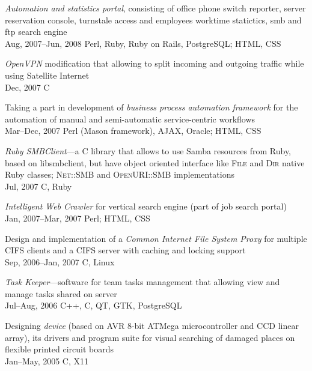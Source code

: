 \documentclass[12pt, a4paper]{article}
\newcommand{\years}[2]{\marginpar{\scriptsize #1 #2}}
\begin{document}
\begin{list}{}{\leftmargin=0pt}
    \item \textit {Automation and statistics portal}, consisting of office phone switch
    reporter, server reservation console, turnstale access and employees
    worktime statictics, smb and ftp search engine\\
    Aug, 2007--Jun, 2008 \hfill Perl, Ruby, Ruby on Rails, PostgreSQL; HTML, CSS

    \item \textit{OpenVPN} modification that allowing to split incoming and outgoing traffic while using Satellite
    Internet\\
    Dec, 2007 \hfill C

    \item Taking a part in development of \textit{business process automation framework}
    for the automation of manual and semi-automatic service-centric
    workflows\\
    Mar--Dec, 2007 \hfill Perl (Mason framework), AJAX, Oracle; HTML, CSS

    \item \textit{Ruby SMBClient}---a C library that allows to use Samba resources from Ruby, based on
    libsmbclient, but have object oriented interface like \textsc{File} and \textsc{Dir} native Ruby classes;
    \textsc{Net::SMB} and \textsc{OpenURI::SMB} implementations\\
    Jul, 2007 \hfill C, Ruby

    \item \textit{Intelligent Web Crawler} for vertical search engine (part of job search
    portal)\\
    Jan, 2007--Mar, 2007 \hfill Perl; HTML, CSS

    \item Design and implementation of a \textit{Common Internet File System Proxy}
    for multiple CIFS clients and a CIFS server with caching and locking
    support\\
    Sep, 2006--Jan, 2007 \hfill C, Linux

    \item \textit{Task Keeper}---software for team tasks management that allowing view and
    manage tasks shared on server\\
    Jul--Aug, 2006 \hfill C++, C, QT, GTK, PostgreSQL

    \item Designing \textit{device} \years{2005}{University project} (based on AVR 8-bit ATMega microcontroller and CCD
    linear array), its drivers and program suite for visual searching of damaged
    places on flexible printed circuit boards\\
    Jan--May, 2005 \hfill C, X11
  \end{list}
\end{document}
